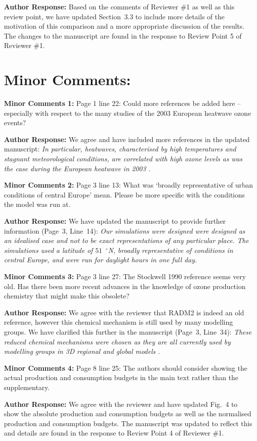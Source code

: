 \documentclass{article}
\DeclareRobustCommand*\degree{\ensuremath{^{\circ}}}
\begin{document}
\textbf{Author Response:} Based on the comments of Reviewer \#1 as well as this review point, we have updated Section~3.3 to include more details of the motivation of this comparison and a more appropriate discussion of the results. The changes to the manuscript are found in the response to Review Point 5 of Reviewer \#1.

\section*{Minor Comments:}

\textbf{Minor Comments 1:} Page 1 line 22: Could more references be added here – especially with respect to the many studies of the 2003 European heatwave ozone events?

\textbf{Author Response:} We agree and have included more references in the updated manuscript:
\textit{
In particular, heatwaves, characterised by high temperatures and stagnant meteorological conditions, are correlated with high ozone levels as was the case during the European heatwave in 2003 \citep{Solberg:2008, Vautard:2005}.
} 

\textbf{Minor Comments 2:}  Page 3 line 13: What was ‘broadly representative of urban conditions of central Europe’ mean. Please be more specific with the conditions the model was run at.

\textbf{Author Response:} We have updated the manuscript to provide further information (Page~3, Line~14):
\textit{
Our simulations were designed were designed as an idealised case and not to be exact representations of any particular place.
The simulations used a latitude of $51$~\degree N, broadly representative of conditions in central Europe, and were run for daylight hours in one full day.
}

\textbf{Minor Comments 3:} Page 3 line 27: The Stockwell 1990 reference seems very old. Has there been more recent advances in the knowledge of ozone production chemistry that might make this obsolete?

\textbf{Author Response:} We agree with the reviewer that RADM2 is indeed an old reference, however this chemical mechanism is still used by many modelling groups. We have clarified this further in the manuscript (Page~3, Line~34):
\textit{
These reduced chemical mechanisms were chosen as they are all currently used by modelling groups in 3D regional and global models \citep{Baklanov:2014}.
}

\textbf{Minor Comments 4:}  Page 8 line 25: The authors should consider showing the actual production and consumption budgets in the main text rather than the supplementary.

\textbf{Author Response:} We agree with the reviewer and have updated Fig.~4 to show the absolute production and consumption budgets as well as the normalised production and consumption budgets. The manuscript was updated to reflect this and details are found in the response to Review Point 4 of Reviewer \#1.



\end{document}
